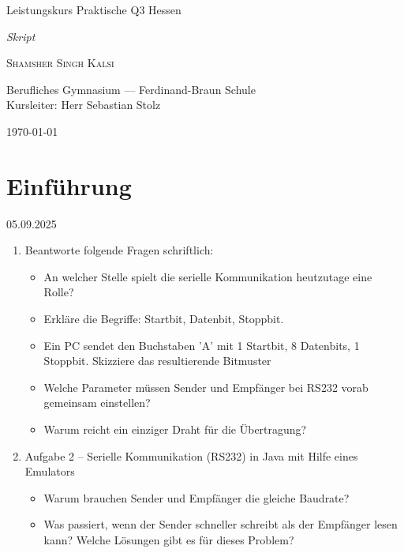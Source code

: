 \documentclass[11pt,a4paper,oneside]{article}
\newcounter{aufgabe}[section]
\renewcommand{\theaufgabe}{\thesection.\arabic{aufgabe}}
\newenvironment{aufgabe}[1]{%
	\refstepcounter{aufgabe}%
	\begin{tcolorbox}[termbase,
		colframe=aufgabeColor!50!black,
		boxed title style={interior style={left color=aufgabeColor, right color=aufgabeColor!70!black}},
		title={Aufgabe~\theaufgabe: #1}]%
	}{\end{tcolorbox}}
\newcommand{\lessondate}[1]{\noindent\hfill\textcolor{Steel}{\textsc{#1}}\\[6pt]}
\newcommand{\MakeArtTitle}[4]{%
	\begin{titlepage}
		\vspace*{18mm}
		\begin{center}
			\vspace{12mm}
			{\huge\color{TextCream} #1 \par}
			\vspace{6mm}
			{\Large\itshape\color{AccentBlue!50} #2 \par}
			\vspace{10mm}
			{\Large\scshape\color{TextCream} #3 \par}
			\vspace{6mm}
			{\small\color{MarginalGray} #4 \par}
			\vspace{5mm}
			{\small\color{MarginalGray} \today \par}
		\end{center}
		\vspace{7.5cm}
		\centering
	\end{titlepage}
}
\begin{document}
	
	\MakeArtTitle{
		Leistungskurs Praktische Q3 Hessen}
	{Skript}
	{Shamsher Singh Kalsi}
	{Berufliches Gymnasium — Ferdinand-Braun Schule \\ Kursleiter: Herr Sebastian Stolz}
	
	\tableofcontents
	\bigskip
	
	\newpage
	
	\section{Einführung}
	\lessondate{05.09.2025}
	
	
	
	\begin{aufgabe}{Serielle Kommunikation}
		\begin{enumerate}
			\item Beantworte folgende Fragen schriftlich:
			\begin{itemize}
				\item An welcher Stelle spielt die serielle Kommunikation heutzutage eine Rolle?
				\item Erkläre die Begriffe: Startbit, Datenbit, Stoppbit.
				\item Ein PC sendet den Buchstaben 'A' mit 1 Startbit, 8 Datenbits, 1 Stoppbit.
				Skizziere das resultierende Bitmuster
				\item Welche Parameter müssen Sender und Empfänger bei RS232 vorab
				gemeinsam einstellen?
				\item Warum reicht ein einziger Draht für die Übertragung?
			\end{itemize}
			\item Aufgabe 2 – Serielle Kommunikation (RS232) in Java mit Hilfe eines Emulators
			\begin{itemize}
				\item Warum brauchen Sender und Empfänger die gleiche Baudrate?
				\item Was passiert, wenn der Sender schneller schreibt als der Empfänger lesen kann? Welche Lösungen gibt es für dieses Problem?
			\end{itemize}
		\end{enumerate}
	\end{aufgabe}
	
	\newpage
	
\end{document}

